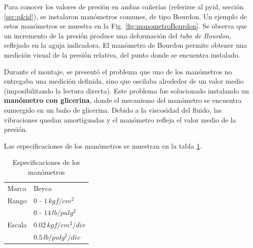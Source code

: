 Para conocer los valores de presión en ambas cañerías
(referirse al \gls{pyid}, sección \ref{sec:p&id}),
se instalaron manómetros comunes, de tipo Bourdon.
Un ejemplo de estos manómetros se muestra en la Fig. \ref{fig:manometroBourdon}.
Se observa que un incremento de la presión produce una deformación
del \emph{tubo de Bourdon}, reflejado en la aguja indicadora.
El manómetro de Bourdon permite obtener una medición visual de la
presión relativa, del punto donde se encuentra instalado.

Durante el montaje, se presentó el problema que uno de los manómetros
no entregaba una medición definida, sino que oscilaba alrededor de un
valor medio (imposibilitando la lectura directa).
Este problema fue solucionado instalando un \textbf{manómetro con glicerina},
donde el mecanismo del manómetro se encuentra sumergido en un baño de glicerina.
Debido a la viscosidad del fluido, las vibraciones quedan amortiguadas
y el manómetro refleja el valor medio de la presión.

Las especificaciones de los manómetros se muestran en la tabla
\ref{tab:EspManoms}.

\begin{table}[ht]
\centering
\begin{tabular}{|l|l|}
\hline
Marca & Beyca\\
Rango & $0$ - $1\,kgf/cm^2$\\
 & $0$ - $14\,lb/pulg^2$\\
Escala & $0.02\,kgf/cm^2/div$\\
& $0.5\,lb/pulg^2/div$\\
\hline
\end{tabular}
\caption{Especificaciones de los manómetros}
\label{tab:EspManoms}
\end{table}
